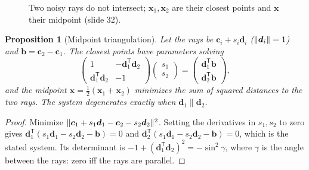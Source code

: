 \documentclass[11pt,a4paper]{article}
\newcommand{\xb}{\bar{\bm{x}}}
\newcommand{\tr}{^{\mathsf T}}
\theoremstyle{definition}
\theoremstyle{plain}
\newtheorem{proposition}[definition]{Proposition}
\theoremstyle{remark}
\begin{document}
\begin{figure}[H]
\centering
{}
\caption{Two noisy rays do not intersect; $\bm x_1,\bm x_2$ are their closest points and $\bm x$ their midpoint (slide 32).}\label{fig:tri}
\end{figure}

\begin{proposition}[Midpoint triangulation]\label{prop:midpoint}
Let the rays be $\bm c_i+s_i\bm d_i$ ($\lVert \bm d_i\rVert=1$) and $\bm b=\bm c_2-\bm c_1$. The closest points have parameters solving
\[
\begin{pmatrix}1&-\bm d_1\tr\bm d_2\\ \bm d_1\tr\bm d_2&-1\end{pmatrix}\begin{pmatrix}s_1\\s_2\end{pmatrix}=\begin{pmatrix}\bm d_1\tr\bm b\\ \bm d_2\tr\bm b\end{pmatrix},
\]
and the midpoint $\bm x=\tfrac12(\bm x_1+\bm x_2)$ minimizes the sum of squared distances to the two rays. The system degenerates exactly when $\bm d_1\parallel\bm d_2$.
\end{proposition}
\begin{proof}
Minimize $\lVert \bm c_1+s_1\bm d_1-\bm c_2-s_2\bm d_2\rVert^2$. Setting the derivatives in $s_1,s_2$ to zero gives $\bm d_1\tr(s_1\bm d_1-s_2\bm d_2-\bm b)=0$ and $\bm d_2\tr(s_1\bm d_1-s_2\bm d_2-\bm b)=0$, which is the stated system. Its determinant is $-1+(\bm d_1\tr\bm d_2)^2=-\sin^2\gamma$, where $\gamma$ is the angle between the rays: zero iff the rays are parallel.
\end{proof}
\end{document}
